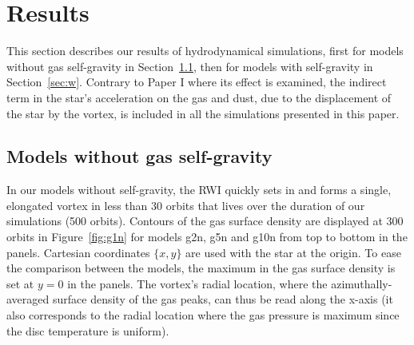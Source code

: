 \documentclass[a4paper,usenatbib]{mnras}
\begin{document}
\section{Results}
\label{sec:results}
This section describes our results of hydrodynamical simulations,
first for models without gas self-gravity in Section~\ref{sec:wo},
then for models with self-gravity in Section~\ref{sec:w}. Contrary to
Paper I where its effect is examined, the indirect term in the star's
acceleration on the gas and dust, due to the displacement of the star
by the vortex, is included in all the simulations presented in this
paper.

\subsection{Models without gas self-gravity}
\label{sec:wo}
In our models without self-gravity, the RWI quickly sets in and forms
a single, elongated vortex in less than 30 orbits that lives over the
duration of our simulations (500 orbits). Contours of the gas surface
density are displayed at 300 orbits in Figure~\ref{fig:g1n} for models
g2n, g5n and g10n from top to bottom in the panels. Cartesian
coordinates $\{x,y\}$ are used with the star at the origin. To ease
the comparison between the models, the maximum in the gas surface
density is set at $y=0$ in the panels. The vortex's radial location,
where the azimuthally-averaged surface density of the gas peaks, can
thus be read along the x-axis (it also corresponds to the radial
location where the gas pressure is maximum since the disc temperature
is uniform).
\end{document}
